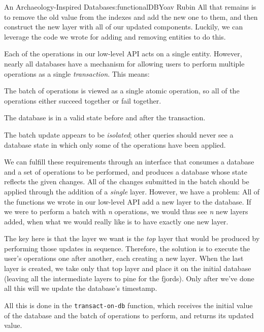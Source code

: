 \begin{aosachapter}{An Archaeology-Inspired Database}{s:functionalDB}{Yoav Rubin}
All that remains is to remove the old value from the indexes and add the
new one to them, and then construct the new layer with all of our
updated components. Luckily, we can leverage the code we wrote for
adding and removing entities to do this.

\label{transactions}

Each of the operations in our low-level API acts on a single entity.
However, nearly all databases have a mechanism for allowing users to
perform multiple operations as a single \emph{transaction}. This means:

\begin{aosaitemize}

\item
  The batch of operations is viewed as a single atomic operation, so all
  of the operations either succeed together or fail together.
\item
  The database is in a valid state before and after the transaction.
\item
  The batch update appears to be \emph{isolated}; other queries should
  never see a database state in which only some of the operations have
  been applied.
\end{aosaitemize}

We can fulfill these requirements through an interface that consumes a
database and a set of operations to be performed, and produces a
database whose state reflects the given changes. All of the changes
submitted in the batch should be applied through the addition of a
\emph{single} layer. However, we have a problem: All of the functions we
wrote in our low-level API add a new layer to the database. If we were
to perform a batch with \emph{n} operations, we would thus see \emph{n}
new layers added, when what we would really like is to have exactly one
new layer.

The key here is that the layer we want is the \emph{top} layer that
would be produced by performing those updates in sequence. Therefore,
the solution is to execute the user's operations one after another, each
creating a new layer. When the last layer is created, we take only that
top layer and place it on the initial database (leaving all the
intermediate layers to pine for the fjords). Only after we've done all
this will we update the database's timestamp.

All this is done in the \texttt{transact-on-db} function, which receives
the initial value of the database and the batch of operations to
perform, and returns its updated value.


\end{aosachapter}

